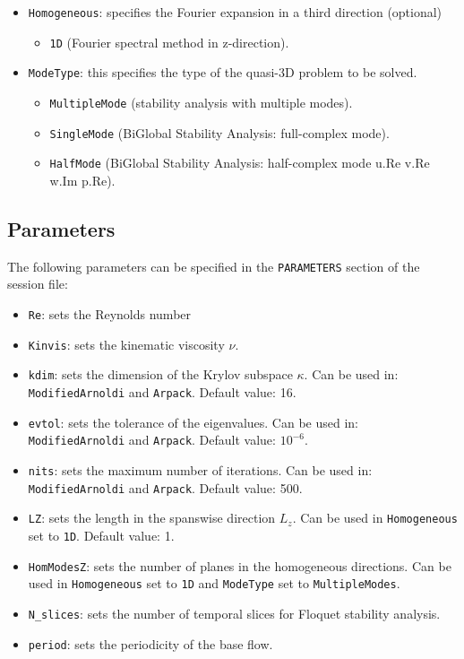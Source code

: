\begin{itemize}
\item \texttt{Homogeneous}: specifies the Fourier expansion in a third direction (optional) 
\begin{itemize}
\item \texttt{1D} (Fourier spectral method in z-direction).
\end{itemize}
\item \texttt{ModeType}: this specifies the type of the quasi-3D problem to be solved.
\begin{itemize}
\item \texttt{MultipleMode} (stability analysis with multiple modes).
\item \texttt{SingleMode} (BiGlobal Stability Analysis: full-complex mode).
\item \texttt{HalfMode} (BiGlobal Stability Analysis: half-complex mode u.Re v.Re w.Im p.Re).
\end{itemize}
\end{itemize}

\subsection{Parameters}

 The following parameters can be specified in the \texttt{PARAMETERS} section of the session file: 
 
 \begin{itemize}
 \item \texttt{Re}: sets the Reynolds number 
 \item \texttt{Kinvis}: sets the kinematic viscosity $\nu$.
 \item \texttt{kdim}: sets the dimension of the Krylov subspace $\kappa$. Can be used in: \texttt{ModifiedArnoldi} and \texttt{Arpack}. Default value: 16.
 \item \texttt{evtol}: sets the tolerance of the eigenvalues. Can be used in: \texttt{ModifiedArnoldi} and \texttt{Arpack}. Default value: $10^{-6}$.
 \item \texttt{nits}: sets the maximum number of iterations. Can be used in: \texttt{ModifiedArnoldi} and \texttt{Arpack}. Default value: 500.
 \item \texttt{LZ}:  sets the length in the spanswise direction $L_z$. Can be used in \texttt{Homogeneous} set to \texttt{1D}. Default value: 1.
 \item \texttt{HomModesZ}: sets the number of planes in the homogeneous directions. Can be used in \texttt{Homogeneous} set to \texttt{1D} and \texttt{ModeType} set to \texttt{MultipleModes}.
  \item \texttt{N\_slices}: sets the number of temporal slices for Floquet stability analysis.
 \item \texttt{period}: sets the periodicity of the base flow. 
 \end{itemize}
 
